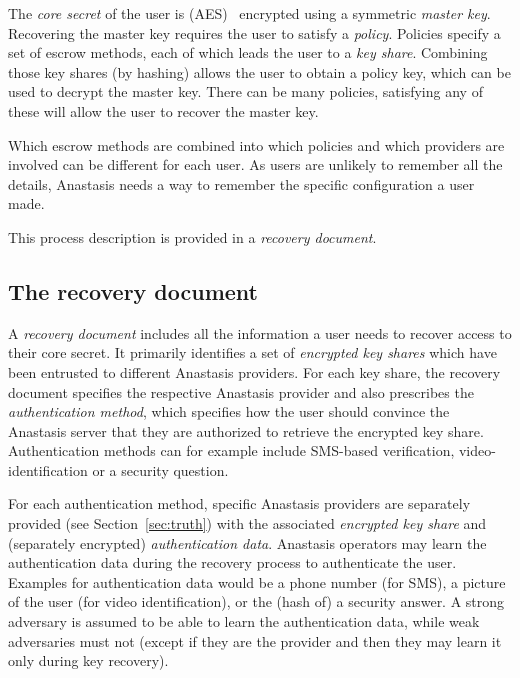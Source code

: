 The {\em core secret} of the user is (AES)~\cite{heron2009} encrypted using a symmetric
{\em master key}.  Recovering the master key requires the user to
satisfy a {\em policy}. Policies specify a set of escrow methods, each
of which leads the user to a {\em key share}. Combining those key
shares (by hashing) allows the user to obtain a policy key, which can
be used to decrypt the master key.  There can be many policies,
satisfying any of these will allow the user to recover the master key.

Which escrow methods are combined into which policies and which
providers are involved can be different for each user. As users are
unlikely to remember all the details, Anastasis needs a way to
remember the specific configuration a user made.

This process description is provided in a {\em recovery document}.



\subsection{The recovery document}

A {\em recovery document} includes all the information a user needs to
recover access to their core secret. It primarily identifies a set of
{\em encrypted key shares} which have been entrusted to different
Anastasis providers. For each key share, the recovery document
specifies the respective Anastasis provider and also prescribes the
{\em authentication method}, which specifies how the user should
convince the Anastasis server that they are authorized to retrieve the
encrypted key share.  Authentication methods can for example include
SMS-based verification, video-identification or a security question.

For each authentication method, specific Anastasis providers are separately
provided (see Section~\ref{sec:truth}) with the associated {\em encrypted key
  share} and (separately encrypted) {\em authentication
  data}. Anastasis operators may learn the authentication data during
the recovery process to authenticate the user. Examples for
authentication data would be a phone number (for SMS), a picture of
the user (for video identification), or the (hash of) a security
answer. A strong adversary is assumed to be able to learn the
authentication data, while weak adversaries must not (except if they
are the provider and then they may learn it only during key recovery).

